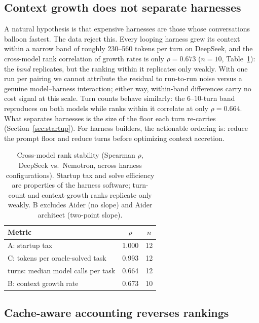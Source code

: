 \documentclass[11pt]{article}
\begin{document}
\subsection{Context growth does not separate harnesses}
\label{sec:growth}

A natural hypothesis is that expensive harnesses are those whose conversations balloon fastest. The data reject this. Every looping harness grew its context within a narrow band of roughly 230--560 tokens per turn on DeepSeek, and the cross-model rank correlation of growth rates is only $\rho = 0.673$ ($n = 10$, Table~\ref{tab:spearman}): the \emph{band} replicates, but the ranking within it replicates only weakly. With one run per pairing we cannot attribute the residual to run-to-run noise versus a genuine model--harness interaction; either way, within-band differences carry no cost signal at this scale. Turn counts behave similarly: the 6--10-turn band reproduces on both models while ranks within it correlate at only $\rho = 0.664$. What separates harnesses is the size of the floor each turn re-carries (Section~\ref{sec:startup}). For harness builders, the actionable ordering is: reduce the prompt floor and reduce turns before optimizing context accretion.

\begin{table}[t]
\centering
\small
\caption{Cross-model rank stability (Spearman $\rho$, DeepSeek vs.\ Nemotron, across harness configurations). Startup tax and solve efficiency are properties of the harness software; turn-count and context-growth ranks replicate only weakly. B excludes Aider (no slope) and Aider architect (two-point slope).}
\label{tab:spearman}
\begin{tabular}{l c c}
\toprule
Metric & $\rho$ & $n$ \\
\midrule
A: startup tax & 1.000 & 12 \\
C: tokens per oracle-solved task & 0.993 & 12 \\
turns: median model calls per task & 0.664 & 12 \\
B: context growth rate & 0.673 & 10 \\
\bottomrule
\end{tabular}
\end{table}

\subsection{Cache-aware accounting reverses rankings}
\label{sec:cache}
\end{document}
